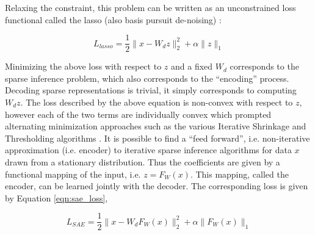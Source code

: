 Relaxing the constraint, this problem can be written as an unconstrained loss
functional called the lasso (also basis pursuit de-noising) \cite{BP}:  

\begin{equation} 
L_{lasso} = \frac{1}{2}\|x-W_dz\|^2_2 + \alpha \|z\|_1
\label{eqn:lasso} 
\end{equation} 

Minimizing the above loss with respect to $z$ and a fixed $W_d$ corresponds to
the sparse inference problem, which also corresponds to the ``encoding''
process. Decoding sparse representations is trivial, it simply corresponds to
computing $W_dz$.  The loss described by the above equation is non-convex with
respect to $z$, however each of the two terms are individually convex which
prompted alternating minimization approaches such as the various Iterative
Shrinkage and Thresholding algorithms \cite{FISTA}. It is possible to find a
``feed forward'', i.e. non-iterative approximation (i.e. encoder) to
iterative sparse inference algorithms for data $x$ drawn from a stationary
distribution. Thus the coefficients are given by a functional mapping of the input,
i.e. $z=F_W(x)$. This mapping, called the encoder, can be learned jointly with
the decoder.  The corresponding loss is given by Equation \ref{eqn:sae_loss}, 

\begin{equation} 
L_{SAE} = \frac{1}{2}\|x-W_dF_W(x)\|^2_2 + \alpha \|F_W(x)\|_1
\label{eqn:sae_loss} 
\end{equation} 

